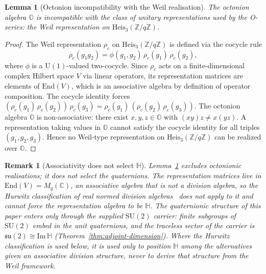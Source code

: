 \documentclass[11pt,a4paper]{article}
\newtheorem{lemma}[theorem]{Lemma}
\newtheorem{remark}[theorem]{Remark}
\newcommand{\ImH}{\mathrm{Im}\,\mathbb{H}}
\newcommand{\su}{\mathfrak{su}}
\newcommand{\SU}{\mathrm{SU}}
\newcommand{\Heis}{\mathrm{Heis}_{3}(\mathbb{Z}/q\mathbb{Z})}
\begin{document}
    \begin{lemma}[Octonion incompatibility with the Weil realisation]
      \label{lem:octonion-exclusion}
      The octonion algebra $\mathbb{O}$ is incompatible with the class of unitary
      representations used by the O-series: the Weil representation on $\Heis$.
    \end{lemma}

    \begin{proof}
      The Weil representation $\rho_{c}$ on $\Heis$ is defined via the cocycle rule
      \[
        \rho_{c}(g_{1} g_{2}) = \phi(g_{1}, g_{2})\, \rho_{c}(g_{1})\, \rho_{c}(g_{2}),
      \]
      where $\phi$ is a $\mathrm{U}(1)$-valued two-cocycle.
      Since $\rho_{c}$ acts on a finite-dimensional complex Hilbert space $V$ via linear
      operators, its representation matrices are elements of $\mathrm{End}(V)$, which is
      an associative algebra by definition of operator composition.
      The cocycle identity forces
      $(\rho_{c}(g_{1})\, \rho_{c}(g_{2}))\, \rho_{c}(g_{3})
      = \rho_{c}(g_{1})\,(\rho_{c}(g_{2})\, \rho_{c}(g_{3}))$.
      The octonion algebra $\mathbb{O}$ is non-associative: there exist
      $x, y, z \in \mathbb{O}$ with $(xy)z \neq x(yz)$.
      A representation taking values in $\mathbb{O}$ cannot satisfy the cocycle identity
      for all triples $(g_{1}, g_{2}, g_{3})$.
      Hence no Weil-type representation on $\Heis$ can be realized over $\mathbb{O}$.
    \end{proof}

    \begin{remark}[Associativity does not select $\mathbb{H}$]
      \label{rem:no-hurwitz-selection}
      Lemma~\ref{lem:octonion-exclusion} excludes octonionic realisations; it does not
      select the quaternions.
      The representation matrices live in $\mathrm{End}(V) = M_{q}(\mathbb{C})$, an
      associative algebra that is \emph{not} a division algebra, so the Hurwitz
      classification of real normed division algebras~\cite{Hurwitz1898} does not apply
      to it and cannot force the representation algebra to be $\mathbb{H}$.
      The quaternionic structure of this paper enters only through the supplied
      $\SU(2)$ carrier: finite subgroups of $\SU(2)$ embed in the unit quaternions, and
      the traceless sector of the carrier is $\su(2) \cong \ImH$
      (Theorem~\ref{thm:adjoint-dimension}).
      Where the Hurwitz classification is used below, it is used only to position
      $\mathbb{H}$ among the alternatives \emph{given} an associative division structure,
      never to derive that structure from the Weil framework.
    \end{remark}
\end{document}
